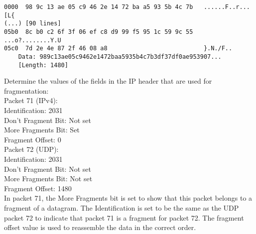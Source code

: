 \begin{lstlisting}
0000  98 9c 13 ae 05 c9 46 2e 14 72 ba a5 93 5b 4c 7b   ......F..r...[L{
(...) [90 lines]
05b0  8c b0 c2 6f 3f 06 ef c8 d9 99 f5 95 1c 59 9c 55   ...o?........Y.U
05c0  7d 2e 4e 87 2f 46 08 a8                           }.N./F..
    Data: 989c13ae05c9462e1472baa5935b4c7b3df37df0ae953907...
    [Length: 1480]
\end{lstlisting}


Determine the values of the fields in the IP header that are used for fragmentation: \\

Packet 71 (IPv4): \\
Identification: 2031\\
Don't Fragment Bit: Not set\\
More Fragments Bit: Set\\
Fragment Offset: 0\\

Packet 72 (UDP): \\
Identification: 2031\\
Don't Fragment Bit: Not set\\
More Fragments Bit: Not set\\
Fragment Offset: 1480\\

In packet 71, the More Fragments bit is set to show that this packet belongs to a fragment of a datagram. The Identification is set to be the same as the UDP packet 72 to indicate that packet 71 is a fragment for packet 72. The fragment offset value is used to reassemble the data in the correct order. \\
